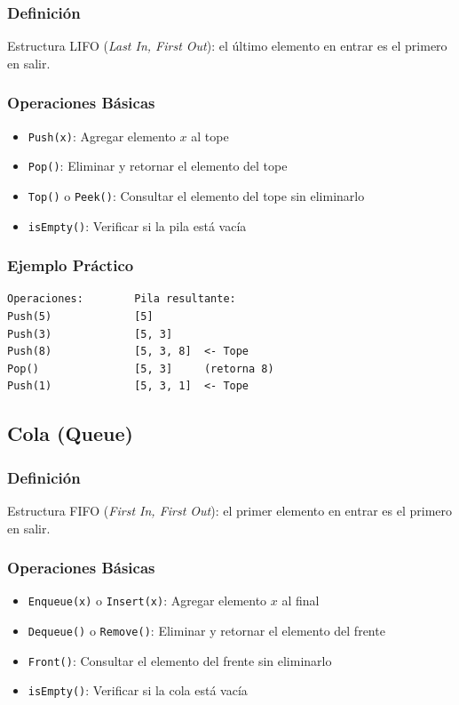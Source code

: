 \documentclass[12pt,a4paper]{article}
\begin{document}
\subsubsection{Definición}
Estructura LIFO (\textit{Last In, First Out}): el último elemento en entrar es el primero en salir.

\subsubsection{Operaciones Básicas}
\begin{itemize}
    \item \texttt{Push(x)}: Agregar elemento $x$ al tope
    \item \texttt{Pop()}: Eliminar y retornar el elemento del tope
    \item \texttt{Top()} o \texttt{Peek()}: Consultar el elemento del tope sin eliminarlo
    \item \texttt{isEmpty()}: Verificar si la pila está vacía
\end{itemize}

\subsubsection{Ejemplo Práctico}
\begin{verbatim}
Operaciones:        Pila resultante:
Push(5)             [5]
Push(3)             [5, 3]
Push(8)             [5, 3, 8]  <- Tope
Pop()               [5, 3]     (retorna 8)
Push(1)             [5, 3, 1]  <- Tope
\end{verbatim}

\subsection{Cola (Queue)}

\subsubsection{Definición}
Estructura FIFO (\textit{First In, First Out}): el primer elemento en entrar es el primero en salir.

\subsubsection{Operaciones Básicas}
\begin{itemize}
    \item \texttt{Enqueue(x)} o \texttt{Insert(x)}: Agregar elemento $x$ al final
    \item \texttt{Dequeue()} o \texttt{Remove()}: Eliminar y retornar el elemento del frente
    \item \texttt{Front()}: Consultar el elemento del frente sin eliminarlo
    \item \texttt{isEmpty()}: Verificar si la cola está vacía
\end{itemize}
\end{document}
